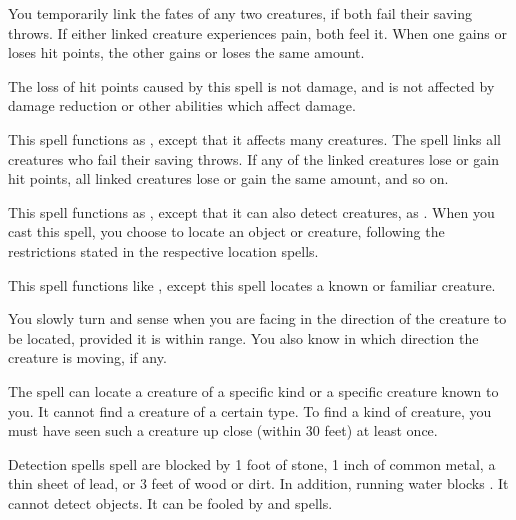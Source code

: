 \spelldur{\durshort}
\begin{spelleffect}
  You temporarily link the fates of any two creatures, if both fail their saving throws. If either linked creature experiences pain, both feel it. When one gains or loses hit points, the other gains or loses the same amount.
\end{spelleffect}
\begin{spellnotes}
  The loss of hit points caused by this spell is not damage, and is not affected by damage reduction or other abilities which affect damage.
\end{spellnotes}

\begin{spelleffect}
  This spell functions as , except that it affects many creatures. The spell links all creatures who fail their saving throws. If any of the linked creatures lose or gain hit points, all linked creatures lose or gain the same amount, and so on.
\end{spelleffect}

\spellrng{\rngext}
\begin{spelleffect}
  This spell functions as , except that it can also detect creatures, as . When you cast this spell, you choose to locate an object or creature, following the restrictions stated in the respective location spells.
\end{spelleffect}

\begin{spelleffect}
  This spell functions like , except this spell locates a known or familiar creature.
  \par You slowly turn and sense when you are facing in the direction of the creature to be located, provided it is within range. You also know in which direction the creature is moving, if any.
  \par The spell can locate a creature of a specific kind or a specific creature known to you. It cannot find a creature of a certain type. To find a kind of creature, you must have seen such a creature up close (within 30 feet) at least once.
\end{spelleffect}
\begin{spellnotes}
  Detection spells spell are blocked by 1 foot of stone, 1 inch of common metal, a thin sheet of lead, or 3 feet of wood or dirt. In addition, running water blocks . It cannot detect objects. It can be fooled by  and  spells.
\end{spellnotes}


